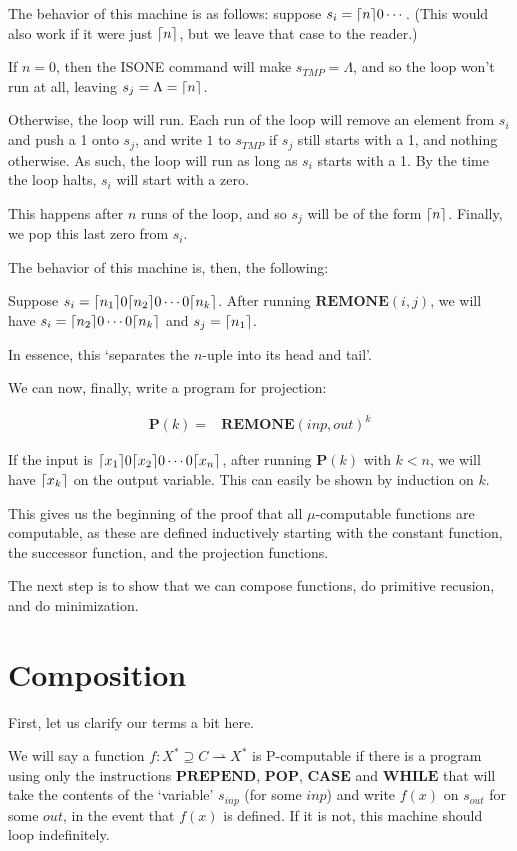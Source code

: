 \documentclass{article}
\DeclarePairedDelimiter{\ceil}{\lceil}{\rceil}
\newcommand{\PREPEND}{\mathbf{PREPEND}}
\newcommand{\POP}{\mathbf{POP}}
\newcommand{\CASE}{\mathbf{CASE}}
\newcommand{\WHILE}{\mathbf{WHILE}}
\newcommand{\REMONE}{\mathbf{REMONE}}
\newcommand{\PR}{\mathbf{P}}
\begin{document}
	The behavior of this machine is as follows: suppose $s_i = \ceil{n}0\cdots$. (This would also work if it were just $\ceil{n}$, but we leave that case to the reader.)
	
	If $n = 0$, then the ISONE command will make $s_{TMP} = \Lambda$, and so the loop won't run at all, leaving $s_j = \Lambda = \ceil{n}$.
	
	Otherwise, the loop will run. Each run of the loop will remove an element from $s_i$ and push a 1 onto $s_j$, and write $1$ to $s_{TMP}$ if $s_j$ still starts with a 1, and nothing otherwise. As such, the loop will run as long as $s_i$ starts with a 1. By the time the loop halts, $s_i$ will start with a zero.
	
	This happens after $n$ runs of the loop, and so $s_j$ will be of the form $\ceil{n}$. Finally, we pop this last zero from $s_i$.
	
	The behavior of this machine is, then, the following:
	
	Suppose $s_i = \ceil{n_1} 0 \ceil{n_2} 0 \cdots 0 \ceil{n_k}$. After running $\REMONE(i, j)$, we will have $s_i = \ceil{n_2} 0 \cdots 0 \ceil{n_k}$ and $s_j = \ceil{n_1}$.
	
	In essence, this `separates the $n$-uple into its head and tail'.
	
	We can now, finally, write a program for projection:
	
	\begin{align*}
	\PR(k) =& \REMONE(inp, out)^k
	\end{align*}
	
	If the input is $\ceil{x_1} 0 \ceil{x_2} 0 \cdots 0 \ceil{x_n}$, after running $\PR(k)$ with $k < n$, we will have $\ceil{x_k}$ on the output variable. This can easily be shown by induction on $k$.
	
	This gives us the beginning of the proof that all $\mu$-computable functions are computable, as these are defined inductively starting with the constant function, the successor function, and the projection functions.
	
	The next step is to show that we can compose functions, do primitive recusion, and do minimization.
	
	\section{Composition}
	
	First, let us clarify our terms a bit here.
	
	We will say a function $f : X^* \supseteq C \rightharpoonup X^*$ is P-computable if there is a program using only the instructions $\PREPEND$, $\POP$, $\CASE$ and $\WHILE$ that will take the contents of the `variable' $s_{inp}$ (for some $inp$) and write $f(x)$ on $s_{out}$ for some $out$, in the event that $f(x)$ is defined. If it is not, this machine should loop indefinitely.
	
\end{document}
